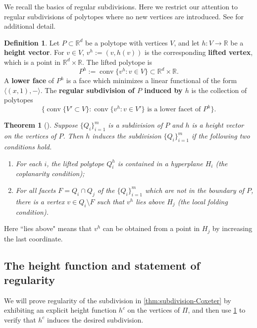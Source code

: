 \documentclass[11pt]{amsart}
\newtheorem{theorem}[Thm]{Theorem}
\theoremstyle{definition}
\newtheorem{definition}[Thm]{Definition}
\newcommand{\RR}{\mathbb{R}}
\newcommand\defn[1]{{\bf #1}}
\def\hgt{h}
\def\hc{\hgt^c}
\DeclareMathOperator{\conv}{conv}
\begin{document}
We recall the basics of regular subdivisions. Here we restrict our attention to regular subdivisions of polytopes where no new vertices are introduced. See \cite{DLRS-triang-book} for additional detail.

\begin{definition}
  Let $P \subset \RR^d$ be a polytope with vertices $V$, and let
  $h:V \to \RR$ be a \defn{height vector}.
  For $v \in V$, $v^h:= (v, h(v))$ is the corresponding \defn{lifted vertex},
  which is a point in $\RR^d \times \RR$. The lifted polytope is
  \[P^h:= \conv\{v^h: v \in V\} \subset \RR^d \times \RR.\]
  A \defn{lower face} of $P^h$ is a face which minimizes a linear functional of the form $\langle (x, 1), - \rangle$.
	The \defn{regular subdivision of $P$ induced by $h$} is the collection of polytopes
	\[\{\conv\{V' \subset V\}: \conv\{v^h: v \in V'\} \text{ is a lower facet of }P^h\}.\]
\end{definition}


\begin{theorem}[{\cite[Theorem 2.3.20]{DLRS-triang-book}}]\label{thm:regular-subdiv-conditions}
	Suppose $\{Q_i\}_{i=1}^m$ is a subdivision of $P$ and $h$ is a height vector on the vertices of $P$. Then $h$ induces the subdivision $\{Q_i\}_{i=1}^m$ if the following two conditions hold.
	\begin{enumerate}
		\item For each $i$, the lifted polytope $Q_i^h$ is contained in a hyperplane $H_i$ (the coplanarity condition);
		\item[(2)] For all facets $F=Q_i \cap Q_j$ of the $\{Q_i\}_{i=1}^m$ which are not in the boundary of $P$, there is a vertex $v \in Q_i \setminus F$ such that $v^h$ lies above $H_j$ (the local folding condition).
	\end{enumerate}
\end{theorem}

Here ``lies above" means that $v^h$ can be obtained from a point in $H_j$ by increasing the last coordinate.


\subsection{The height function and statement of regularity}

We will prove regularity of the subdivision in \cref{thm:subdivision-Coxeter} by exhibiting an explicit height function $\hc$ on the vertices of $\Pi$, and then  use \cref{thm:regular-subdiv-conditions} to verify that $\hc$ induces the desired subdivision.
\end{document}
